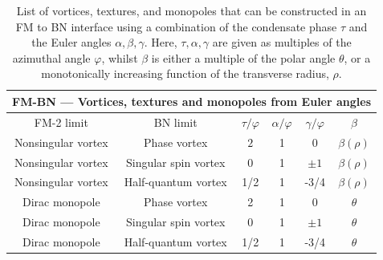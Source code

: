\begin{table}
    \centering
    \begin{tabular}{cccccc}
        \toprule
        \multicolumn{6}{c}{FM-BN --- Vortices, textures and monopoles from Euler
            angles} \\
        \midrule
        FM-2 limit & BN limit & \(\tau/\varphi\) & \(\alpha/\varphi\)
            & \(\gamma/\varphi\) & \(\beta\) \\
        \midrule
        Nonsingular vortex & Phase vortex & \(2\) & 1 & \(0\)
            & \(\beta(\rho)\) \\ 
        Nonsingular vortex & Singular spin vortex  & \(0\) & 1 & \(\pm 1\)
            & \(\beta(\rho)\) \\ 
        Nonsingular vortex & Half-quantum vortex & 1/2 & 1 & -3/4
            & \(\beta(\rho)\) \\ 
        Dirac monopole & Phase vortex & 2 & 1  & 0 & \(\theta\)\\
        Dirac monopole & Singular spin vortex & 0 & 1  & \(\pm 1\)
            & \(\theta\)\\
        Dirac monopole & Half-quantum vortex & 1/2 & 1  & -3/4 & \(\theta\) \\
        \bottomrule
    \end{tabular}
    \caption{\label{tab: FM-BN-other}List of vortices, textures, and monopoles
    that can be constructed in an FM to BN interface using a combination
    of the condensate phase \(\tau\) and the Euler angles \(\alpha, \beta,
    \gamma\).
    Here, \(\tau, \alpha, \gamma\) are given as multiples of the azimuthal angle
    \(\varphi\), whilst \(\beta\) is either a multiple of the polar angle
    \(\theta\), or a monotonically increasing function of the transverse radius,
    \(\rho\).}
\end{table}

